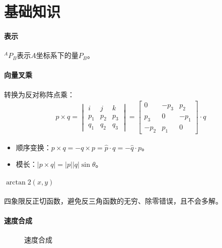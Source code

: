 \documentclass[
12pt, %
a4paper, 
oneside, %
headinclude,footinclude, %
]{scrartcl}
\title{\normalfont\spacedallcaps{机器人学导论}}
\date{}
\begin{document}
\maketitle
\newpage
\hypertarget{toc}{}
\tableofcontents 
\newpage
\listoffigures
\listoftables
\listoftips
\newpage
\section{基础知识}
\paragraph{表示}
$ ^A P_B $表示$ A $坐标系下的量$ P_B $。
\paragraph{向量叉乘}
转换为反对称阵点乘：
\begin{align*}
p \times q
= \begin{vmatrix} i & j & k \\ p_1 & p_2 & p_3 \\ q_1 & q_2 & q_3 \end{vmatrix}
= \begin{bmatrix} 0 & -p_3 & p_2 \\ p_3 & 0 & -p_1 \\ -p_2 & p_1 & 0 \end{bmatrix} \cdot q
\end{align*}

\begin{itemize}
\item 顺序变换：$ p \times q = -q \times p = \hat{p} \cdot q = -\hat{q} \cdot p $。
\item 模长：$ |p \times q| = |p||q|\sin\theta $。
\end{itemize}
\paragraph{$ \arctan 2(x, y) $}
四象限反正切函数，避免反三角函数的无穷、除零错误，且不会多解。
\paragraph{速度合成}
\begin{figure}[H]
\centering
{} \quad
{}
\caption[速度合成]{速度合成}
\end{figure}
\end{document}

